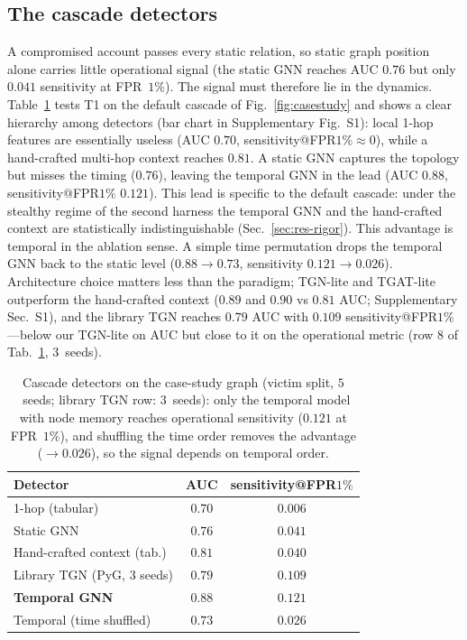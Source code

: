 \subsection{The cascade detectors}
\label{sec:res-detectors}
A compromised account passes every static relation, so static graph position alone carries little
operational signal (the static GNN reaches AUC $0.76$ but only $0.041$ sensitivity at FPR~$1\%$). The
signal must therefore lie in the dynamics. Table~\ref{tab:detectors} tests T1 on the default cascade of
Fig.~\ref{fig:casestudy} and shows a clear hierarchy among detectors (bar chart in Supplementary Fig.~S1):
local 1-hop features are essentially useless (AUC $0.70$, sensitivity@FPR$1\%\!\approx\!0$), while a
hand-crafted multi-hop context reaches $0.81$. A static GNN captures the topology but misses the timing
($0.76$), leaving the temporal GNN in the lead (AUC $0.88$, sensitivity@FPR$1\%$ $0.121$). This lead is
specific to the default cascade: under the stealthy regime of the second harness the temporal GNN and the
hand-crafted context are statistically indistinguishable (Sec.~\ref{sec:res-rigor}). This advantage is
temporal in the ablation sense. A simple time permutation drops the temporal GNN back to the static level
($0.88\!\to\!0.73$, sensitivity $0.121\!\to\!0.026$). Architecture choice matters less than the paradigm;
TGN-lite and TGAT-lite outperform the hand-crafted context ($0.89$ and $0.90$ vs $0.81$ AUC;
Supplementary Sec.~S1), and the library TGN
\citep{rossi2020temporal} reaches $0.79$ AUC with $0.109$ sensitivity@FPR$1\%$---below our TGN-lite on
AUC but close to it on the operational metric (row $8$ of Tab.~\ref{tab:detectors}, $3$~seeds).

\begin{table}[pos=tbp]\centering
\begin{tabular}{lcc}
\toprule
Detector & AUC & sensitivity@FPR$1\%$ \\
\midrule
1-hop (tabular)        & $0.70$ & $0.006$ \\
Static GNN               & $0.76$ & $0.041$ \\
Hand-crafted context (tab.) & $0.81$ & $0.040$ \\
Library TGN (PyG, 3 seeds) & $0.79$ & $0.109$ \\
\textbf{Temporal GNN}     & $\mathbf{0.88}$ & $\mathbf{0.121}$ \\
Temporal (time shuffled) & $0.73$ & $0.026$ \\
\bottomrule
\end{tabular}
\caption{Cascade detectors on the case-study graph (victim split, $5$~seeds; library TGN row: $3$~seeds):
only the temporal model with node memory reaches operational sensitivity ($0.121$ at FPR~$1\%$), and
shuffling the time order removes the advantage ($\to\!0.026$), so the signal depends on temporal order.}
\label{tab:detectors}
\end{table}

